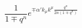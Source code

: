 \begin{equation}
\frac{1}{1\mp q^n} e^{\mp \alpha'k_\mu k^\mu \frac{q^n}{2n(1\mp q^n)}}
\end{equation}

